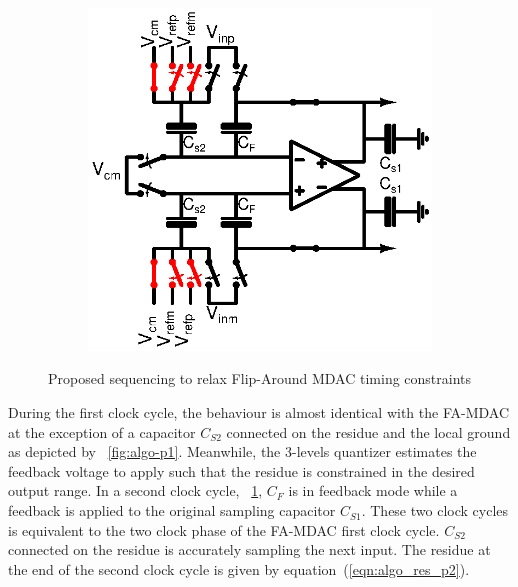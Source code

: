 \begin{figure}[htp]
\begin{subfigure}[b]{0.32\textwidth}
		\label{fig:algo-p2}
	\end{subfigure}
	\begin{subfigure}[b]{0.32\textwidth}
		\centering
		\includegraphics[width=\textwidth]{Chapter4/Figs/algorithmic-mdac-p3.ps}
		\label{fig:algo-p3}
	\end{subfigure}
	\caption{Proposed sequencing to relax Flip-Around MDAC timing constraints}
	\label{fig:algo-seq-proposed}
\end{figure}

During the first clock cycle, the behaviour is almost identical with the FA-MDAC at the exception of a capacitor \(C_{S2}\) connected on the residue and the local ground as depicted by \figurename~\ref{fig:algo-p1}. Meanwhile, the 3-levels quantizer estimates the feedback voltage to apply such that the residue is constrained in the desired output range. In a second clock cycle, \figurename~\ref{fig:algo-p2}, \(C_F\) is in feedback mode while a feedback is applied to the original sampling capacitor \(C_{S1}\). These two clock cycles is equivalent to the two clock phase of the FA-MDAC first clock cycle. \(C_{S2}\) connected on the residue is accurately sampling the next input. The residue at the end of the second clock cycle is given by equation~(\ref{eqn:algo_res_p2}).

